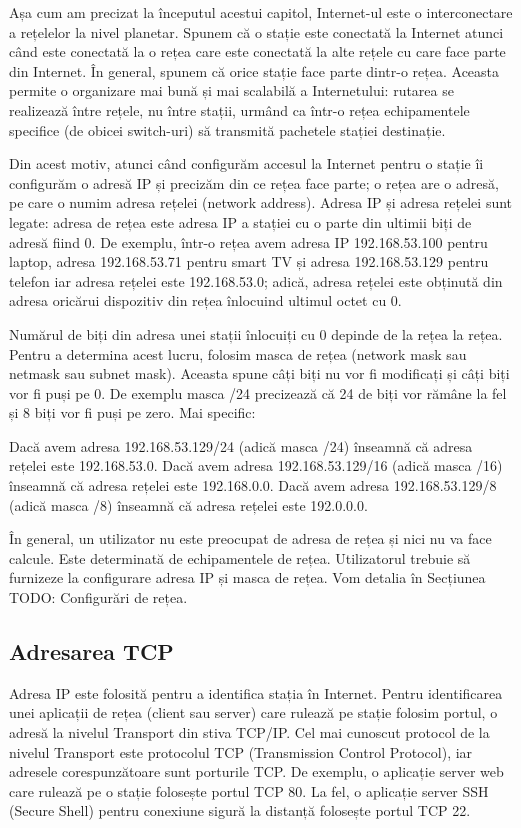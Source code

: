 Așa cum am precizat la începutul acestui capitol, Internet-ul este o interconectare a rețelelor la nivel planetar. Spunem că o stație este conectată la Internet atunci când este conectată la o rețea care este conectată la alte rețele cu care face parte din Internet. În general, spunem că orice stație face parte dintr-o rețea. Aceasta permite o organizare mai bună și mai scalabilă a Internetului: rutarea se realizează între rețele, nu între stații, urmând ca într-o rețea echipamentele specifice (de obicei switch-uri) să transmită pachetele stației destinație.

Din acest motiv, atunci când configurăm accesul la Internet pentru o stație îi configurăm o adresă IP și precizăm din ce rețea face parte; o rețea are o adresă, pe care o numim adresa rețelei (network address). Adresa IP și adresa rețelei sunt legate: adresa de rețea este adresa IP a stației cu o parte din ultimii biți de adresă fiind 0. De exemplu, într-o rețea avem adresa IP 192.168.53.100 pentru laptop, adresa 192.168.53.71 pentru smart TV și adresa 192.168.53.129 pentru telefon iar adresa rețelei este 192.168.53.0; adică, adresa rețelei este obținută din adresa oricărui dispozitiv din rețea înlocuind ultimul octet cu 0.

Numărul de biți din adresa unei stații înlocuiți cu 0 depinde de la rețea la rețea. Pentru a determina acest lucru, folosim masca de rețea (network mask sau netmask sau subnet mask). Aceasta spune câți biți nu vor fi modificați și câți biți vor fi puși pe 0. De exemplu masca /24 precizează că 24 de biți vor rămâne la fel și 8 biți vor fi puși pe zero. Mai specific:

Dacă avem adresa 192.168.53.129/24 (adică masca /24) înseamnă că adresa rețelei este 192.168.53.0.
Dacă avem adresa 192.168.53.129/16 (adică masca /16) înseamnă că adresa rețelei este 192.168.0.0.
Dacă avem adresa 192.168.53.129/8 (adică masca /8) înseamnă că adresa rețelei este 192.0.0.0.

În general, un utilizator nu este preocupat de adresa de rețea și nici nu va face calcule. Este determinată de echipamentele de rețea. Utilizatorul trebuie să furnizeze la configurare adresa IP și masca de rețea. Vom detalia în Secțiunea TODO: Configurări de rețea.

\subsection{Adresarea TCP}
\label{sec:net:tcp-address}

Adresa IP este folosită pentru a identifica stația în Internet. Pentru identificarea unei aplicații de rețea (client sau server) care rulează pe stație folosim portul, o adresă la nivelul Transport din stiva TCP/IP. Cel mai cunoscut protocol de la nivelul Transport este protocolul TCP (Transmission Control Protocol), iar adresele corespunzătoare sunt porturile TCP. De exemplu, o aplicație server web care rulează pe o stație folosește portul TCP 80. La fel, o aplicație server SSH (Secure Shell) pentru conexiune sigură la distanță folosește portul TCP 22.

